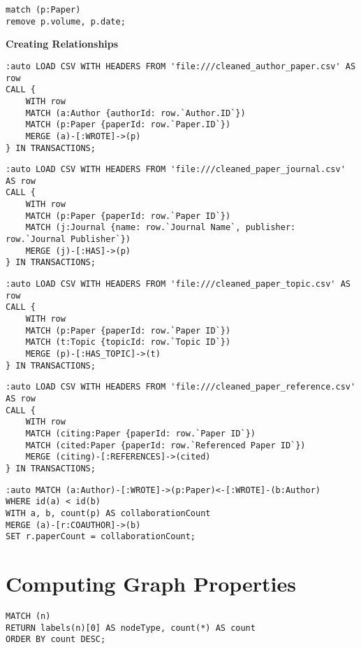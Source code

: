 \documentclass{article}
\theoremstyle{mytheoremstyle}
\theoremstyle{mytheoremstyle}
\theoremstyle{myproblemstyle}
\begin{document}
\begin{lstlisting}[style=cypherstyle]
match (p:Paper)
remove p.volume, p.date;
\end{lstlisting}



\textbf{Creating Relationships}

\begin{lstlisting}[style=cypherstyle]
:auto LOAD CSV WITH HEADERS FROM 'file:///cleaned_author_paper.csv' AS row
CALL {
    WITH row
    MATCH (a:Author {authorId: row.`Author.ID`})
    MATCH (p:Paper {paperId: row.`Paper.ID`})
    MERGE (a)-[:WROTE]->(p)
} IN TRANSACTIONS;
\end{lstlisting}

\begin{lstlisting}[style=cypherstyle]
:auto LOAD CSV WITH HEADERS FROM 'file:///cleaned_paper_journal.csv' AS row
CALL {
    WITH row
    MATCH (p:Paper {paperId: row.`Paper ID`})
    MATCH (j:Journal {name: row.`Journal Name`, publisher: row.`Journal Publisher`})
    MERGE (j)-[:HAS]->(p)
} IN TRANSACTIONS;
\end{lstlisting}

\begin{lstlisting}[style=cypherstyle]
:auto LOAD CSV WITH HEADERS FROM 'file:///cleaned_paper_topic.csv' AS row
CALL {
    WITH row
    MATCH (p:Paper {paperId: row.`Paper ID`})
    MATCH (t:Topic {topicId: row.`Topic ID`})
    MERGE (p)-[:HAS_TOPIC]->(t)
} IN TRANSACTIONS;
\end{lstlisting}

\begin{lstlisting}[style=cypherstyle]
:auto LOAD CSV WITH HEADERS FROM 'file:///cleaned_paper_reference.csv' AS row
CALL {
    WITH row
    MATCH (citing:Paper {paperId: row.`Paper ID`})
    MATCH (cited:Paper {paperId: row.`Referenced Paper ID`})
    MERGE (citing)-[:REFERENCES]->(cited)
} IN TRANSACTIONS;
\end{lstlisting}

\begin{lstlisting}[style=cypherstyle]
:auto MATCH (a:Author)-[:WROTE]->(p:Paper)<-[:WROTE]-(b:Author)
WHERE id(a) < id(b)  
WITH a, b, count(p) AS collaborationCount
MERGE (a)-[r:COAUTHOR]->(b)
SET r.paperCount = collaborationCount;
\end{lstlisting}

\section{Computing Graph Properties}
\begin{lstlisting}[style=cypherstyle]
MATCH (n)
RETURN labels(n)[0] AS nodeType, count(*) AS count
ORDER BY count DESC;
\end{lstlisting}
\end{document}
